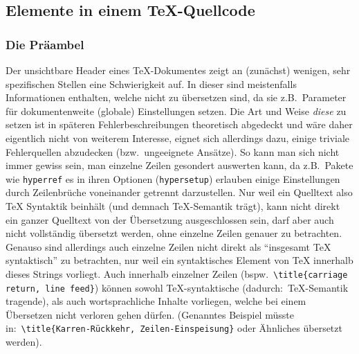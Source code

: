 \newpage

\subsection{Elemente in einem \TeX{}-Quellcode}
\subsubsection{Die Präambel}
Der unsichtbare Header eines \TeX{}-Dokumentes zeigt an (zunächst) wenigen, sehr spezifischen Stellen eine Schwierigkeit auf. In dieser sind meistenfalls Informationen enthalten, welche nicht zu übersetzen sind, da sie z.B.\ Parameter für dokumentenweite (globale) Einstellungen setzen. Die Art und Weise \textit{diese} zu setzen ist in späteren Fehlerbeschreibungen theoretisch abgedeckt und wäre daher eigentlich nicht von weiterem Interesse, eignet sich allerdings dazu, einige triviale Fehlerquellen abzudecken (bzw.\ ungeeignete Ansätze). 
So kann man sich nicht immer gewiss sein, man einzelne Zeilen gesondert auswerten kann, da z.B.\ Pakete wie \texttt{hyperref} es in ihren Optionen (\texttt{hypersetup}) erlauben einige Einstellungen durch Zeilenbrüche voneinander getrennt darzustellen. Nur weil ein Quelltext also \TeX{} Syntaktik beinhält (und demnach \TeX{}-Semantik trägt), kann nicht direkt ein ganzer Quelltext von der Übersetzung ausgeschlossen sein, darf aber auch nicht vollständig übersetzt werden, ohne einzelne Zeilen genauer zu betrachten.%
Genauso sind allerdings auch einzelne Zeilen nicht direkt als \enquote{insgesamt \TeX{} syntaktisch} zu betrachten, nur weil ein syntaktisches Element von \TeX{} innerhalb dieses Strings vorliegt. Auch innerhalb einzelner Zeilen (bspw.\ \verb|\title{carriage return, line feed}|) können sowohl \TeX{}-syntaktische (dadurch:\ \TeX{}-Semantik tragende), als auch wortsprachliche Inhalte vorliegen, welche bei einem Übersetzen nicht verloren gehen dürfen. (Genanntes Beispiel müsste in:\ \verb|\title{Karren-Rückkehr, Zeilen-Einspeisung}| oder Ähnliches übersetzt werden).

